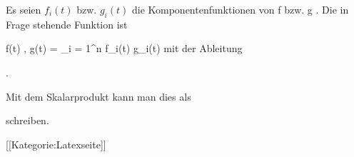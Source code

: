 Es seien $f_i(t)$ bzw. $g_i(t)$ die Komponentenfunktionen von
\mathkor {} {f} {bzw.} {g} {.}
Die in Frage stehende Funktion ist

\mavergleichskettedisp
{\vergleichskette
{  \left\langle f(t) , g(t)  \right\rangle
}
{ =} { \sum_{i = 1}^n  f_i(t) g_i(t)
}
{ } {
}
{ } {
}
{ } {
}
}
{}{}{}
mit der Ableitung
 {} {}

 { . }

Mit dem Skalarprodukt kann man dies als

 {  }

schreiben.

 [[Kategorie:Latexseite]]
